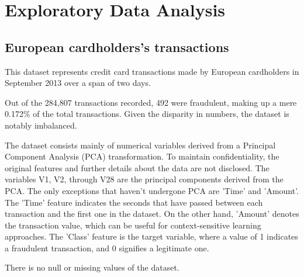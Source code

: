\section{Exploratory Data Analysis}

\subsection{European cardholders's transactions}

This dataset represents credit card transactions made by European cardholders in September 2013 over a span of two days.

Out of the 284,807 transactions recorded, 492 were fraudulent, making up a mere 0.172\% of the total transactions. Given the disparity in numbers, the dataset is notably imbalanced.

The dataset consists mainly of numerical variables derived from a Principal Component Analysis (PCA) transformation. To maintain confidentiality, the original features and further details about the data are not disclosed. The variables V1, V2, through V28 are the principal components derived from the PCA. The only exceptions that haven't undergone PCA are 'Time' and 'Amount'. The 'Time' feature indicates the seconds that have passed between each transaction and the first one in the dataset. On the other hand, 'Amount' denotes the transaction value, which can be useful for context-sensitive learning approaches. The 'Class' feature is the target variable, where a value of 1 indicates a fraudulent transaction, and 0 signifies a legitimate one.

There is no null or missing values of the dataset.


